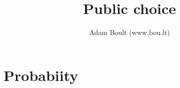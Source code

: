 \documentclass[oneside]{book}
\begin{document}
\author{Adam Boult (www.bou.lt)}
\title{Public choice}
\maketitle

\setcounter{tocdepth}{0}
\tableofcontents



\part{Probabiity}

\end{document}
